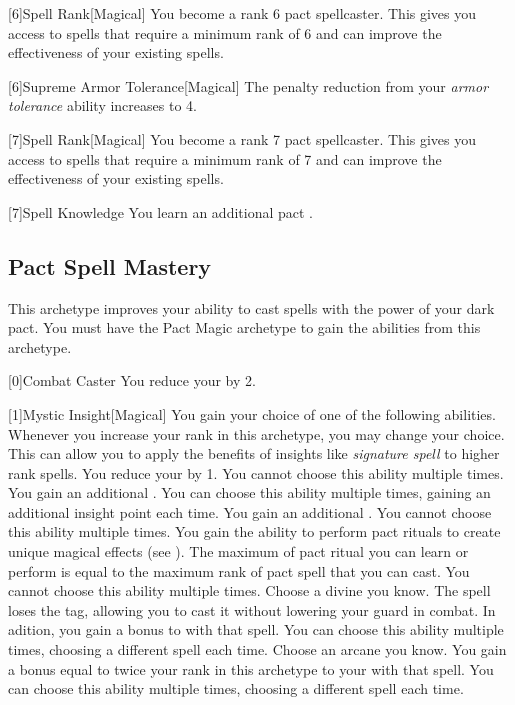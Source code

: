         [6]{Spell Rank}[Magical] You become a rank 6 pact spellcaster.
        This gives you access to spells that require a minimum rank of 6 and can improve the effectiveness of your existing spells.

        [6]{Supreme Armor Tolerance}[Magical] The penalty reduction from your \textit{armor tolerance} ability increases to 4.

        [7]{Spell Rank}[Magical] You become a rank 7 pact spellcaster.
        This gives you access to spells that require a minimum rank of 7 and can improve the effectiveness of your existing spells.

        [7]{Spell Knowledge} You learn an additional pact .

    \newpage
    \subsection{Pact Spell Mastery}
        This archetype improves your ability to cast spells with the power of your dark pact.
        You must have the Pact Magic archetype to gain the abilities from this archetype.

        [0]{Combat Caster} You reduce your  by 2.

        [1]{Mystic Insight}[Magical]
        You gain your choice of one of the following abilities.
        Whenever you increase your rank in this archetype, you may change your choice.
        This can allow you to apply the benefits of insights like \textit{signature spell} to higher rank spells.
        {
             You reduce your  by 1.
                You cannot choose this ability multiple times.
             You gain an additional .
                You can choose this ability multiple times, gaining an additional insight point each time.
             You gain an additional .
                You cannot choose this ability multiple times.
             You gain the ability to perform pact rituals to create unique magical effects (see ).
                The maximum  of pact ritual you can learn or perform is equal to the maximum rank of pact spell that you can cast.
                You cannot choose this ability multiple times.
             Choose a divine  you know.
                The spell loses the  tag, allowing you to cast it without lowering your guard in combat.
                In adition, you gain a  bonus to  with that spell.
                You can choose this ability multiple times, choosing a different spell each time.
             Choose an arcane  you know.
                You gain a bonus equal to twice your rank in this archetype to your  with that spell.
                You can choose this ability multiple times, choosing a different spell each time.
        }

